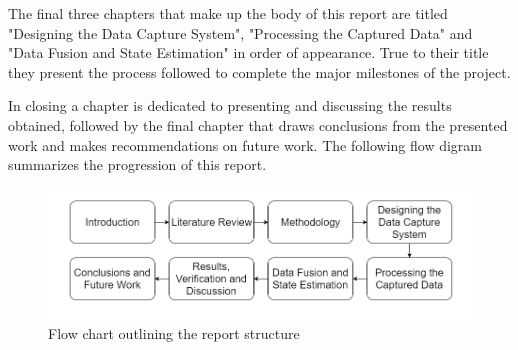 The final three chapters that make up the body of this report are titled "Designing the Data Capture System", "Processing the Captured Data" and "Data Fusion and State Estimation" in order of appearance. True to their title they present the process followed to complete the major milestones of the project.

In closing a chapter is dedicated to presenting and discussing the results obtained, followed by the final chapter that draws conclusions from the presented work and makes recommendations on future work. The following flow digram summarizes the progression of this report.

\begin{figure}[!ht] 
\captionsetup{width=\linewidth, font=small}  
\includegraphics[width=\linewidth]{figures/introflow.png}
\caption{Flow chart outlining the report structure}
\label{fig:introflow}
\end{figure}